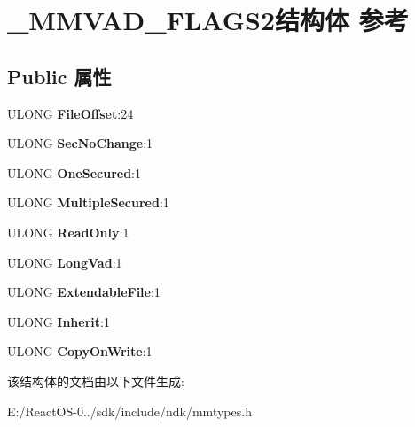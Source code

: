 \hypertarget{struct___m_m_v_a_d___f_l_a_g_s2}{}\section{\+\_\+\+M\+M\+V\+A\+D\+\_\+\+F\+L\+A\+G\+S2结构体 参考}
\label{struct___m_m_v_a_d___f_l_a_g_s2}
\subsection*{Public 属性}
\begin{DoxyCompactItemize}
\item 
\mbox{\label{struct___m_m_v_a_d___f_l_a_g_s2_a3422becd5cf795c356d7107c0b0edd9e}} 
U\+L\+O\+NG {\bfseries File\+Offset}\+:24
\item 
\mbox{\label{struct___m_m_v_a_d___f_l_a_g_s2_af2846b932a8705265b1a3cf0fe34da67}} 
U\+L\+O\+NG {\bfseries Sec\+No\+Change}\+:1
\item 
\mbox{\label{struct___m_m_v_a_d___f_l_a_g_s2_a988e628269f2a62fd35434a9687ba85d}} 
U\+L\+O\+NG {\bfseries One\+Secured}\+:1
\item 
\mbox{\label{struct___m_m_v_a_d___f_l_a_g_s2_a6892e112a5872af131df6020b84b4ef2}} 
U\+L\+O\+NG {\bfseries Multiple\+Secured}\+:1
\item 
\mbox{\label{struct___m_m_v_a_d___f_l_a_g_s2_a288c5967f5c922a55bb14950dd3da8a8}} 
U\+L\+O\+NG {\bfseries Read\+Only}\+:1
\item 
\mbox{\label{struct___m_m_v_a_d___f_l_a_g_s2_af1b4896d078061809383b44efe84fdf9}} 
U\+L\+O\+NG {\bfseries Long\+Vad}\+:1
\item 
\mbox{\label{struct___m_m_v_a_d___f_l_a_g_s2_a88e8f57cb04dd7dd22cb59cd16246d4f}} 
U\+L\+O\+NG {\bfseries Extendable\+File}\+:1
\item 
\mbox{\label{struct___m_m_v_a_d___f_l_a_g_s2_aa530011367dad6dd4f063667e49d06ae}} 
U\+L\+O\+NG {\bfseries Inherit}\+:1
\item 
\mbox{\label{struct___m_m_v_a_d___f_l_a_g_s2_a56572eb16c044dd434cde0cbd4d31b1d}} 
U\+L\+O\+NG {\bfseries Copy\+On\+Write}\+:1
\end{DoxyCompactItemize}


该结构体的文档由以下文件生成\+:\begin{DoxyCompactItemize}
\item 
E\+:/\+React\+O\+S-\/0../sdk/include/ndk/mmtypes.\+h\end{DoxyCompactItemize}
